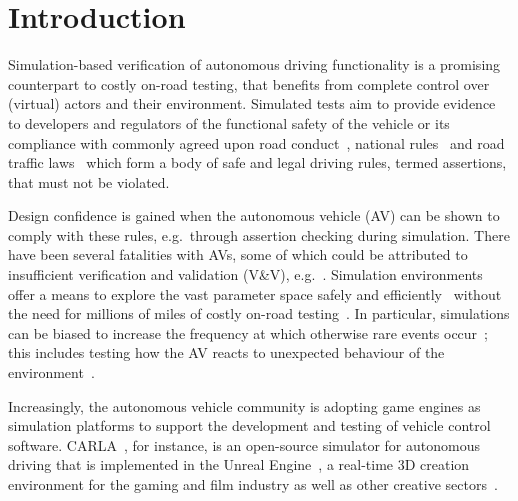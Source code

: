 \documentclass[runningheads,twocolumn,a4paper,10pt]{llncs}
\begin{document}
\section{Introduction} \label{s:introduction}
%
Simulation-based verification of autonomous driving functionality is a promising counterpart to costly on-road testing, that benefits from complete control over (virtual) actors and their environment.
%
Simulated tests aim to provide evidence to developers and regulators of the functional safety of the vehicle or its compliance with commonly agreed upon road conduct~\cite{ViennaConv}, national rules~\cite{codes2015highway} and road traffic laws~\cite{RoadTraffic1988} which form a body of safe and legal driving rules, termed assertions, that must not be violated. 

Design confidence is gained when the autonomous vehicle (AV) can be shown to comply with these rules, e.g.\ through assertion checking during simulation. 
There have been several fatalities with AVs, some of which could be attributed to insufficient verification and validation (V\&V), e.g.~\cite{FatalityExample}. Simulation environments offer a means to explore the vast parameter space safely and efficiently~\cite{korosec2019waymo} without the need for millions of miles of costly on-road testing~\cite{kalra2016driving}. In particular, simulations can be biased to increase the frequency at which otherwise rare events occur~\cite{Koopman2018}; this includes testing how the AV reacts to unexpected behaviour of the environment~\cite{RobustnessAutonomy}. 

Increasingly, the autonomous vehicle community is adopting game engines as simulation platforms to support the development and testing of vehicle control software. 
%
CARLA~\cite{carla_main_website}, for instance, is an open-source simulator for autonomous driving that is implemented in the Unreal Engine~\cite{UE4_main_website}, a real-time 3D creation environment for the gaming and film industry as well as other creative sectors~\cite{CARLA_paper}. 
\end{document}
